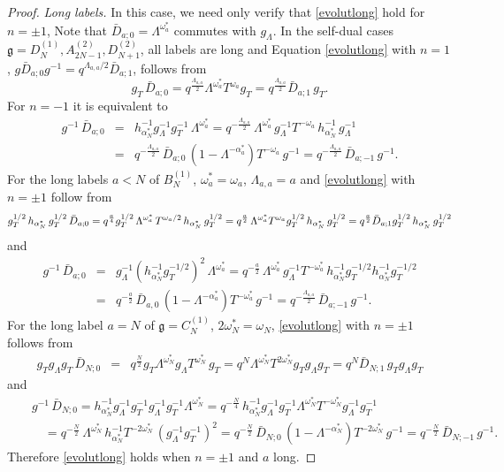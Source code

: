 \documentclass[12pt]{amsart}
\newcommand{\barD}{\bar D}
\newcommand{\g}{{\mathfrak{g}}}
\newcommand{\al}{{\alpha}}
\newcommand{\lL}{{\Lambda}}
\numberwithin{equation}{section}
\begin{document}
\begin{proof}
{\em Long labels.} In this case, we need only verify that \eqref{evolutlong} hold for $n=\pm1$,
%
Note that $\barD_{a;0}=\Lambda^{\omega_a^*}$ commutes with $g_\Lambda$.
%
In the self-dual cases $\g=D_N^{(1)}, A_{2N-1}^{(2)},D_{N+1}^{(2)}$, all labels are long
and Equation \eqref{evolutlong} with $n=1$, $g \barD_{a;0} g^{-1}=q^{\Lambda_{a,a}/2}\barD_{a;1}$, follows from
%
$$g_T \,\barD_{a;0}=  %
q^{\frac{\Lambda_{a,a}}{2}} \lL^{\omega_a^*} T^{\omega_a}  g_T  =q^{\frac{\Lambda_{a,a}}{2}} \barD_{a;1}\, g_T.$$
For $n=-1$ it is equivalent to
%
\begin{eqnarray*}
g^{-1}\, \barD_{a;0}&=& h_{\al_N^*}^{-1}g_\lL^{-1}g_T^{-1} \,\lL^{\omega_a^*} =
q^{-\frac{\lL_{a,a}}{2}} \, \lL^{\omega_a^*} \,g_\lL^{-1}T^{-\omega_a}\, h_{\al_N^*}^{-1}\,g_\lL^{-1}\\
&=& q^{-\frac{\lL_{a,a}}{2}}\, \barD_{a;0}\,(1-\lL^{-\al_a^*})T^{-\omega_a}\,g^{-1}=q^{-\frac{\lL_{a,a}}{2}} \, \barD_{a;-1}\,g^{-1} .
\end{eqnarray*}
%
%
For the long labels $a<N$ of $B_N^{(1)}$, $\omega_a^*=\omega_a$, $\Lambda_{a,a}=a$ and \eqref{evolutlong} with $n=\pm1$ follow from
\begin{equation*}g_T^{1/2}\,h_{\al_N^*} \,g_T^{1/2}\,\barD_{a;0}= q^{\frac{a}{4}} g_T^{1/2}\,\lL^{\omega_a^*}\,T^{\omega_a/2}\,h_{\al_N^*} \,g_T^{1/2}\\
= q^{\frac a2} \,\lL^{\omega_a^*} T^{\omega_a}g_T^{1/2}\,h_{\al_N^*} \,g_T^{1/2}= q^{\frac a2} \barD_{a;1}g_T^{1/2}\,h_{\al_N^*} \,g_T^{1/2}
\end{equation*}
and
\begin{eqnarray*}
g^{-1}\, \barD_{a;0}&=&g_\lL^{-1}(h_{\al_N^*}^{-1}g_T^{-1/2})^2\,\lL^{\omega_a^*} 
%
%
%
=q^{-\frac{a}{2}}\,\lL^{\omega_a^*}\,
g_\lL^{-1}  T^{-\omega_a^*} \,h_{\al_N^*}^{-1}g_T^{-1/2}h_{\al_N^*}^{-1}g_T^{-1/2}\\
&=&q^{-\frac{a}{2}}\, 
\barD_{a,0}\,(1-\lL^{-\al_a^*})T^{-\omega_a^*} \,g^{-1}=q^{-\frac{\Lambda_{a,a}}{2}}\, \barD_{a;-1}\,g^{-1}.
\end{eqnarray*}
For the long label $a=N$ of $\g=C_N^{(1)}$, $2\omega_N^*=\omega_N$, \eqref{evolutlong} with $n=\pm1$ follows from
\begin{eqnarray*}g_T g_\lL g_T \,\barD_{N;0}&=&q^{\frac{N}{2}} g_T \lL^{\omega_N^*} g_\lL  T^{\omega_N^*}\, g_T 
=q^N \lL^{\omega_N^*} T^{2\omega_N^*}g_T g_\lL g_T=q^N\barD_{N;1}\, g_T g_\lL g_T 
\end{eqnarray*}
%
and
\begin{eqnarray*}
&&g^{-1}\, \barD_{N;0}=h_{\al_N^*}^{-1}g_\lL^{-1}g_T^{-1}g_\lL^{-1}g_T^{-1}\lL^{\omega_N^*} = 
q^{-\frac{N}{4}}\, h_{\al_N^*}^{-1}g_\lL^{-1}g_T^{-1}\lL^{\omega_N^*}T^{-\omega_N^*}g_\lL^{-1}g_T^{-1}\\
&&\quad=q^{-\frac{N}{2}}\,\lL^{\omega_N^*}\,h_{\al_N^*}^{-1}T^{-2\omega_N^*}\,(g_\lL^{-1}g_T^{-1})^2=q^{-\frac{N}{2}}\,\barD_{N;0}\,(1-\lL^{-\al_N^*}) T^{-2\omega_N^*}\,g^{-1}=q^{-\frac{N}{2}}\,\barD_{N;-1}\, g^{-1}.
\end{eqnarray*}
Therefore \eqref{evolutlong} holds when $n=\pm1$ and $a$ long.


\end{proof}
\end{document}
